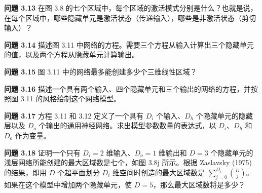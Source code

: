 \textbf{问题 3.13} 在图 3.8 的七个区域中，每个区域的激活模式分别是什么？也就是说，在每个区域中，哪些隐藏单元是激活状态（传递输入），哪些是非激活状态（剪切输入）？

\textbf{问题 3.14} 描述图 3.11 中网络的方程。需要三个方程从输入计算出三个隐藏单元的值，以及两个方程从隐藏单元计算输出。

\textbf{问题 3.15} 图 3.11 中的网络最多能创建多少个三维线性区域？

\textbf{问题 3.16} 描述一个具有两个输入、四个隐藏单元和三个输出的网络的方程，并按照图 3.11 的风格绘制这个网络模型。

\textbf{问题 3.17} 方程 3.11 和 3.12 定义了一个具有 \(D_i\) 个输入、\(D_h\) 个隐藏单元的隐藏层以及 \(D_o\) 个输出的通用神经网络。求出模型参数数量的表达式，以 \(D_i\)、\(D_h\) 和 \(D_o\) 作为变量。

\textbf{问题 3.18} 证明一个只有 \(D_i = 2\) 维输入、\(D_o = 1\) 维输出和 \(D = 3\) 个隐藏单元的浅层网络所能创建的最大区域数是七个，如图 3.8j 所示。根据 Zaslavsky (1975) 的结果，即用 \(D\) 个超平面划分 \(D_i\) 维空间时创造的最大区域数是 \(\sum_{j=0}^{D_i} \binom{D}{j}\)。如果在这个模型中增加两个隐藏单元，使 \(D = 5\)，那么最大区域数将是多少？

